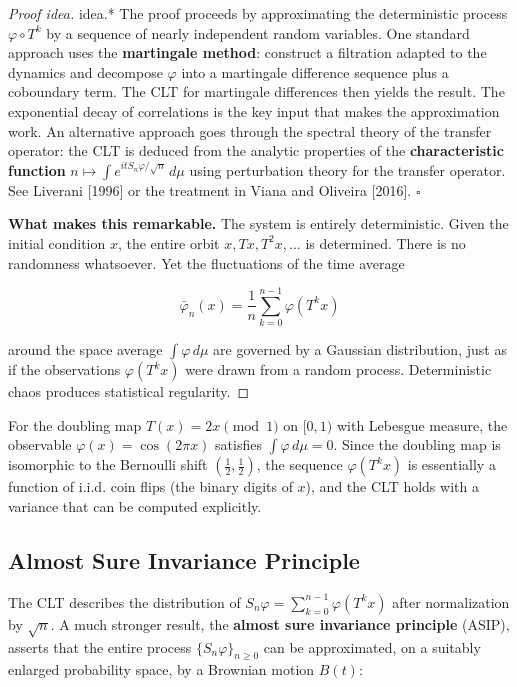 \begin{proof}[Proof idea]
idea.* The proof proceeds by approximating the deterministic process $\varphi \circ T^k$ by a sequence of nearly independent random variables. One standard approach uses the \textbf{martingale method}: construct a filtration adapted to the dynamics and decompose $\varphi$ into a martingale difference sequence plus a coboundary term. The CLT for martingale differences then yields the result. The exponential decay of correlations is the key input that makes the approximation work. An alternative approach goes through the spectral theory of the transfer operator: the CLT is deduced from the analytic properties of the \textbf{characteristic function} $n \mapsto \int e^{it S_n \varphi / \sqrt{n}} \, d\mu$ using perturbation theory for the transfer operator. See Liverani [1996] or the treatment in Viana and Oliveira [2016]. $\square$

\textbf{What makes this remarkable.} The system is entirely deterministic. Given the initial condition $x$, the entire orbit $x, Tx, T^2 x, \ldots$ is determined. There is no randomness whatsoever. Yet the fluctuations of the time average

\[
\bar{\varphi}_n(x) = \frac{1}{n} \sum_{k=0}^{n-1} \varphi(T^k x)
\]

around the space average $\int \varphi \, d\mu$ are governed by a Gaussian distribution, just as if the observations $\varphi(T^k x)$ were drawn from a random process. Deterministic chaos produces statistical regularity.

\end{proof}

\begin{example}
For the doubling map $T(x) = 2x \pmod{1}$ on $[0,1)$ with Lebesgue measure, the observable $\varphi(x) = \cos(2\pi x)$ satisfies $\int \varphi \, d\mu = 0$. Since the doubling map is isomorphic to the Bernoulli shift $(\frac{1}{2}, \frac{1}{2})$, the sequence $\varphi(T^k x)$ is essentially a function of i.i.d. coin flips (the binary digits of $x$), and the CLT holds with a variance that can be computed explicitly.
\end{example}


\subsection{Almost Sure Invariance Principle}\label{sec:12.3.3}

The CLT describes the distribution of $S_n \varphi = \sum_{k=0}^{n-1} \varphi(T^k x)$ after normalization by $\sqrt{n}$. A much stronger result, the \textbf{almost sure invariance principle} (ASIP), asserts that the entire process $\{S_n \varphi\}_{n \geq 0}$ can be approximated, on a suitably enlarged probability space, by a Brownian motion $B(t)$:

